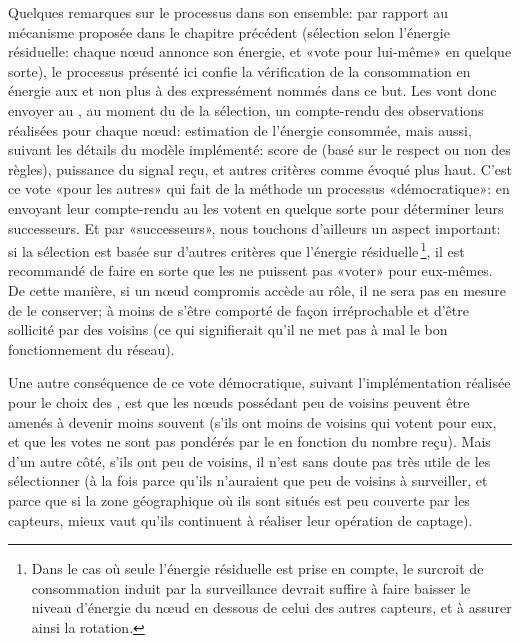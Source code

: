 Quelques remarques sur le processus dans son ensemble: par rapport au mécanisme proposée dans le chapitre précédent (sélection selon l'énergie résiduelle: chaque nœud annonce son énergie, et «vote pour lui-même» en quelque sorte), le processus présenté ici confie la vérification de la consommation en énergie aux \cns et non plus à des \vns expressément nommés dans ce but.
Les \cns vont donc envoyer au \ch, au moment du  de la sélection, un compte-rendu des observations réalisées pour chaque nœud: estimation de l'énergie consommée, mais aussi, suivant les détails du modèle implémenté: score de \reput (basé sur le respect ou non des règles), puissance du signal reçu, et autres critères comme évoqué plus haut.
C'est ce vote «pour les autres» qui fait de la méthode un processus «démocratique»: en envoyant leur compte-rendu au \CH les \cns votent en quelque sorte pour déterminer leurs successeurs.
Et par «successeurs», nous touchons d'ailleurs un aspect important: si la sélection est basée sur d'autres critères que l'énergie résiduelle\,\footnote{Dans le cas où seule l'énergie résiduelle est prise en compte, le surcroit de consommation induit par la surveillance devrait suffire à faire baisser le niveau d'énergie du nœud en dessous de celui des autres capteurs, et à assurer ainsi la rotation.}, il est recommandé de faire en sorte que les \cns ne puissent pas «voter» pour eux-mêmes.
De cette manière, si un nœud compromis accède au rôle, il ne sera pas en mesure de le conserver; à moins de s'être comporté de façon irréprochable et d'être sollicité par des \cns voisins (ce qui signifierait qu'il ne met pas à mal le bon fonctionnement du réseau).

Une autre conséquence de ce vote démocratique, suivant l'implémentation réalisée pour le choix des \cns, est que les nœuds possédant peu de voisins peuvent être amenés à devenir moins souvent \cns (s'ils ont moins de \cns voisins qui votent pour eux, et que les votes ne sont pas pondérés par le \ch en fonction du nombre reçu).
Mais d'un autre côté, s'ils ont peu de voisins, il n'est sans doute pas très utile de les sélectionner (à la fois parce qu'ils n'auraient que peu de voisins à surveiller, et parce que si la zone géographique où ils sont situés est peu couverte par les capteurs, mieux vaut qu'ils continuent à réaliser leur opération de captage).
